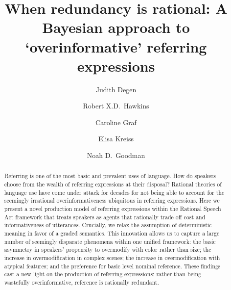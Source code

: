 \documentclass[11pt]{article}
\title{When redundancy is rational: A Bayesian approach to `overinformative' referring expressions}
\author[$\bullet$]{Judith Degen}
\author[$\bullet$]{Robert X.D.~Hawkins}
\author[$\triangleright$]{Caroline Graf}
\author[$\bullet$]{Elisa Kreiss}
\author[$\bullet$]{Noah D.~Goodman}
\affil[$\bullet$]{Stanford University}
\affil[$\triangleright$]{Freie Universit\"at Berlin}
\begin{document}
\maketitle
\thispagestyle{firststyle}

\pagebreak

\pagestyle{mainstyle}
%
%

\begin{abstract}
Referring is one of the most basic and prevalent uses of language. How do speakers choose from the wealth of referring expressions at their disposal? Rational theories of language use have come under attack for decades for not being able to account for the seemingly irrational overinformativeness ubiquitous in referring expressions. Here we present a novel production model of referring expressions within the Rational Speech Act framework that treats speakers as agents that rationally trade off cost and informativeness of utterances. Crucially, we relax the assumption of deterministic meaning in favor of a graded semantics. This innovation allows us to capture a large number of seemingly disparate phenomena within one unified framework: the basic asymmetry in speakers' propensity to overmodify with color rather than size; the increase in overmodification in complex scenes; the increase in overmodification with atypical features; and the preference for basic level nominal reference. These findings cast a new light on the production of referring expressions: rather than being wastefully overinformative, reference is rationally redundant. 
\end{abstract}
\end{document}
